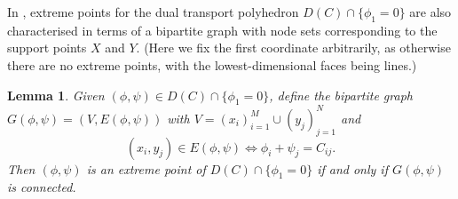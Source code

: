 \documentclass[11pt, oneside, titlepage]{book}
\theoremstyle{plain}
\newtheorem{lemma}[theorem]{Lemma}
\theoremstyle{definition}
\begin{document}
In \cite{balinski1984hirsch, balinski1984faces, balinski1983signatures}, extreme points for the dual transport polyhedron $D(C) \cap \{\phi_1=0\}$ are also characterised in terms of a bipartite graph with node sets corresponding to the support points $X$ and $Y$. (Here we fix the first coordinate arbitrarily, as otherwise there are no extreme points, with the lowest-dimensional faces being lines.)
\begin{lemma} \textnormal{\cite[Lemma 1]{balinski1984faces}}
\label{lemma: balinski dual extreme vertices characterisation}
    Given $(\phi, \psi) \in D(C) \cap \{\phi_1=0\}$, define the bipartite graph $G(\phi, \psi) = (V, E(\phi, \psi))$ with $V = (x_i)_{i=1}^M \cup (y_j)_{j=1}^N$ and
    \begin{equation}
        (x_i, y_j) \in E(\phi, \psi) \iff \phi_i + \psi_j = C_{ij}.
    \end{equation}
    Then $(\phi, \psi)$ is an extreme point of $D(C) \cap \{\phi_1=0\}$ if and only if $G(\phi, \psi)$ is connected.
\end{lemma}
\end{document}

